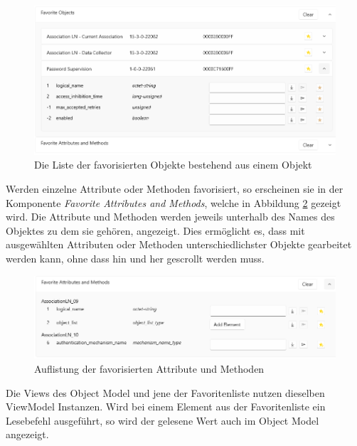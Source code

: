 \begin{figure}
   \centering
   \includegraphics[width=1.0\textwidth]{gfx/favoritesUi.png}
   \caption{
      Die Liste der favorisierten Objekte bestehend aus einem Objekt
      }
   \label{fig:favoritesUi}
\end{figure}

Werden einzelne Attribute oder Methoden favorisiert, so erscheinen sie in der Komponente \textit{Favorite Attributes and Methods}, welche in Abbildung \ref{fig:favoriteAttribtuesAndMethods} gezeigt wird.
Die Attribute und Methoden werden jeweils unterhalb des Names des Objektes zu dem sie gehören, angezeigt.
Dies ermöglicht es, dass mit ausgewählten Attributen oder Methoden unterschiedlichster Objekte gearbeitet werden kann, ohne dass hin und her gescrollt werden muss.
\begin{figure}
   \centering
   \includegraphics[width=1.0\textwidth]{gfx/favoriteAttributeAndMethods.png}
   \caption{
     Auflistung der favorisierten Attribute und Methoden
      }
   \label{fig:favoriteAttribtuesAndMethods}
\end{figure}

Die Views des Object Model und jene der Favoritenliste nutzen dieselben ViewModel Instanzen.
Wird bei einem Element aus der Favoritenliste ein Lesebefehl ausgeführt, so wird der gelesene Wert auch im Object Model angezeigt.